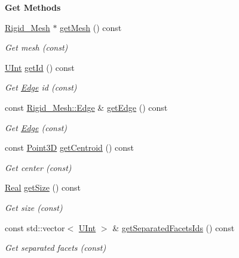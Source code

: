 \begin{Indent}{\bf Get Methods}\par
\begin{DoxyCompactItemize}
\item 
\hyperlink{classFVCode3D_1_1Rigid__Mesh}{Rigid\+\_\+\+Mesh} $\ast$ \hyperlink{classFVCode3D_1_1Rigid__Mesh_1_1Edge__ID_a197a8049cfb5e26c077f668ffb49e6eb}{get\+Mesh} () const 
\begin{DoxyCompactList}\small\item\em Get mesh (const) \end{DoxyCompactList}\item 
\hyperlink{namespaceFVCode3D_a4bf7e328c75d0fd504050d040ebe9eda}{U\+Int} \hyperlink{classFVCode3D_1_1Rigid__Mesh_1_1Edge__ID_af17ee26739dd0bb462a21a90c2c1e633}{get\+Id} () const 
\begin{DoxyCompactList}\small\item\em Get \hyperlink{classFVCode3D_1_1Rigid__Mesh_1_1Edge}{Edge} id (const) \end{DoxyCompactList}\item 
const \hyperlink{classFVCode3D_1_1Rigid__Mesh_1_1Edge}{Rigid\+\_\+\+Mesh\+::\+Edge} \& \hyperlink{classFVCode3D_1_1Rigid__Mesh_1_1Edge__ID_a389e2ca5b81b7256dfadb2150eefcd2e}{get\+Edge} () const 
\begin{DoxyCompactList}\small\item\em Get \hyperlink{classFVCode3D_1_1Rigid__Mesh_1_1Edge}{Edge} (const) \end{DoxyCompactList}\item 
const \hyperlink{classFVCode3D_1_1Point3D}{Point3D} \hyperlink{classFVCode3D_1_1Rigid__Mesh_1_1Edge__ID_ab6f4cafa57b3e7116b815ee96aaf701c}{get\+Centroid} () const 
\begin{DoxyCompactList}\small\item\em Get center (const) \end{DoxyCompactList}\item 
\hyperlink{namespaceFVCode3D_a40c1f5588a248569d80aa5f867080e83}{Real} \hyperlink{classFVCode3D_1_1Rigid__Mesh_1_1Edge__ID_a3834b95f5044df3e95afb2bf657693f6}{get\+Size} () const 
\begin{DoxyCompactList}\small\item\em Get size (const) \end{DoxyCompactList}\item 
const std\+::vector$<$ \hyperlink{namespaceFVCode3D_a4bf7e328c75d0fd504050d040ebe9eda}{U\+Int} $>$ \& \hyperlink{classFVCode3D_1_1Rigid__Mesh_1_1Edge__ID_ab35dc7b716a98f87f64343d2c6d7dbcd}{get\+Separated\+Facets\+Ids} () const 
\begin{DoxyCompactList}\small\item\em Get separated facets (const) \end{DoxyCompactList}\end{DoxyCompactItemize}
\end{Indent}

